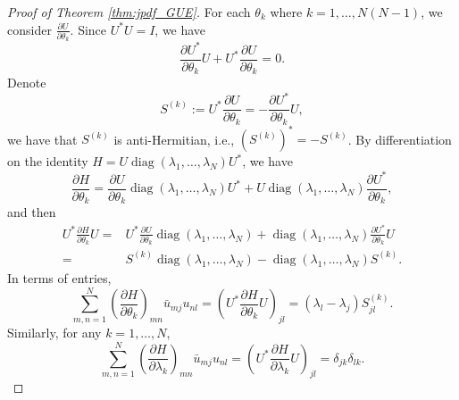 \documentclass[11pt, a4paper]{article}
\numberwithin{equation}{section}
\newcommand{\ie}{i.e.}
\DeclareMathOperator{\diag}{diag}
\theoremstyle{definition}
\theoremstyle{remark}
\begin{document}
\begin{proof}[Proof of Theorem \ref{thm:jpdf_GUE}]
  For each $\theta_k$ where $k = 1, \dotsc, N(N - 1)$, we consider $\frac{\partial U}{\partial \theta_k}$. Since $U^* U = I$, we have
  \begin{equation}
    \frac{\partial U^*}{\partial \theta_k}U + U^*\frac{\partial U}{\partial \theta_k} = 0.
  \end{equation}
  Denote
  \begin{equation}
    S^{(k)} := U^*\frac{\partial U}{\partial \theta_k} = -\frac{\partial U^*}{\partial \theta_k}U,
  \end{equation}
  we have that $S^{(k)}$ is anti-Hermitian, \ie, $(S^{(k)})^* = -S^{(k)}$. By differentiation on the identity $H = U \diag(\lambda_1, \dotsc, \lambda_N) U^*$, we have
  \begin{equation}
    \frac{\partial H}{\partial \theta_k} = \frac{\partial U}{\partial \theta_k} \diag(\lambda_1, \dotsc, \lambda_N) U^* + U \diag(\lambda_1, \dotsc, \lambda_N) \frac{\partial U^*} {\partial \theta_k},
  \end{equation}
  and then
  \begin{equation}
    \begin{split}
      U^* \frac{\partial H}{\partial \theta_k} U = {}& U^* \frac{\partial U}{\partial \theta_k} \diag(\lambda_1, \dotsc, \lambda_N) + \diag(\lambda_1, \dotsc, \lambda_N) \frac{\partial U^*} {\partial \theta_k} U \\
      = {}& S^{(k)} \diag(\lambda_1, \dotsc, \lambda_N) - \diag(\lambda_1, \dotsc, \lambda_N) S^{(k)}.
    \end{split}
  \end{equation}
  In terms of entries,
  \begin{equation} \label{eq:derivative_theta_k}
    \sum^N_{m, n = 1} \left( \frac{\partial H}{\partial \theta_k} \right)_{mn} \bar{u}_{mj} u_{nl} = \left( U^* \frac{\partial H}{\partial \theta_k} U \right)_{jl} = (\lambda_l - \lambda_j) S^{(k)}_{jl}.
  \end{equation}
  Similarly, for any $k = 1, \dotsc, N$,
  \begin{equation} \label{eq:derivative_lambda_k}
    \sum^N_{m, n = 1} \left( \frac{\partial H}{\partial \lambda_k} \right)_{mn} \bar{u}_{mj} u_{nl} = \left( U^* \frac{\partial H}{\partial \lambda_k} U \right)_{jl} = \delta_{jk}\delta_{lk}.
  \end{equation}


\end{proof}
\end{document}
